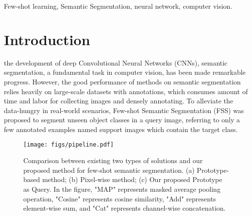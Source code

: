 \documentclass[journal]{IEEEtran}
\begin{document}
\begin{IEEEkeywords}
Few-shot learning, Semantic Segmentation, neural network, computer vision.
\end{IEEEkeywords}

\IEEEpeerreviewmaketitle

\section{Introduction}
 the development of deep Convolutional Neural Networks (CNNs), semantic segmentation, a fundamental task in computer vision, has been made remarkable progress\cite{deeplab,deeplabv3,long2015,fcn,cheng2021maskformer,xie2021segformer}. However, the good performance of methods on semantic segmentation relies heavily on large-scale datasets with annotations\cite{zhou2017scene,cocostuff}, which consumes amount of time and labor for collecting images and densely annotating. To alleviate the data-hungry in real-world scenarios, Few-shot Semantic Segmentation (FSS)\cite{shaban,prototypenet} was proposed to segment unseen object classes in a query image, referring to only a few annotated examples named support images which contain the target class. 

\begin{figure}[t]
  \centering
  \texttt{[image: figs/pipeline.pdf]}
  \caption{Comparison between existing two types of solutions and our proposed method for few-shot semantic segmentation. (a) Prototype-based method; (b) Pixel-wise method; (c) Our proposed Prototype as Query. In the figure, "MAP" represents masked average pooling operation, "Cosine" represents cosine similarity, "Add" represents element-wise sum, and "Cat" represents channel-wise concatenation.}
  \label{fig:pipeline}
\end{figure}
\end{document}
